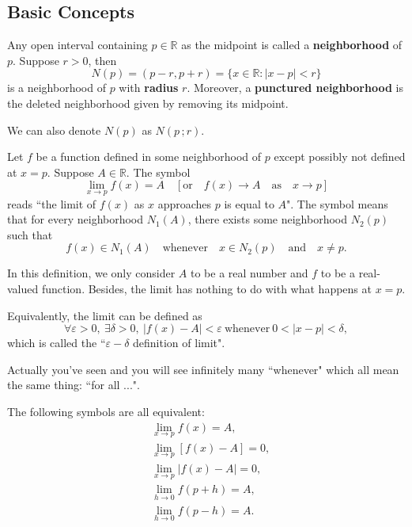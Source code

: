 \documentclass[a4paper]{ctexart}
\begin{document}
	\subsection{Basic Concepts}
	\begin{mydef}
		Any open interval containing $p\in \mathbb{R}$ as the midpoint is called a \textbf{neighborhood} of $p$. Suppose $r>0$, then
		\[
		N(p)=(p-r,p+r)=\{ x\in \mathbb{R} : |x-p|<r \}
		\]
		is a neighborhood of $p$ with \textbf{radius} $r$. Moreover, a \textbf{punctured neighborhood} is the deleted neighborhood given by removing its midpoint.
	\end{mydef}
	\begin{mynot}
		We can also denote $N(p)$ as $N(p\,;r)$.
	\end{mynot}
	\begin{mydef}
		Let $f$ be a function defined in some neighborhood of $p$ except possibly not defined at $x=p$. Suppose $A\in \mathbb{R}$. The symbol
		\[
		\lim_{x\to p} f(x)=A \quad \left[\text{or} \quad f(x)\rightarrow A\quad \text{as}\quad x\to p\right] 
		\]
		reads ``the limit of $f(x)$ as $x$ approaches $p$ is equal to $A$". The symbol means that for every neighborhood $N_1(A)$, there exists some neighborhood $N_2(p)$ such that
		\[
		f(x)\in N_1(A)\quad \text{whenever}\quad x\in N_2(p)\quad \text{and}\quad x\neq p.
		\]
	\end{mydef}
	\begin{myrmk}
		In this definition, we only consider $A$ to be a real number and $f$ to be a real-valued function. Besides, the limit has nothing to do with what happens at $x=p$. 
	\end{myrmk}
	\begin{mydef}
		Equivalently, the limit can be defined as
		\[
		\forall \varepsilon >0,\ \exists \delta>0,\ |f(x)-A|<\varepsilon\ \text{whenever}\ 0<|x-p|<\delta,
		\]
		which is called the ``$\varepsilon-\delta$ definition of limit".
	\end{mydef}
	\begin{myrmk}
		Actually you've seen and you will see infinitely many ``whenever" which all mean the same thing: ``for all ...".
	\end{myrmk}
	\begin{myrmk}
		The following symbols are all equivalent:
		\begin{align*}
			&\lim_{x\to p} f(x)=A, \\
			&\lim_{x\to p} \left[ f(x)-A\right]=0, \\
			&\lim_{x\to p} |f(x)-A|=0,\\
			&\lim_{h\to 0} f(p+h)=A, \\
			&\lim_{h\to 0} f(p-h)=A.
		\end{align*}
	\end{myrmk}
\end{document}
